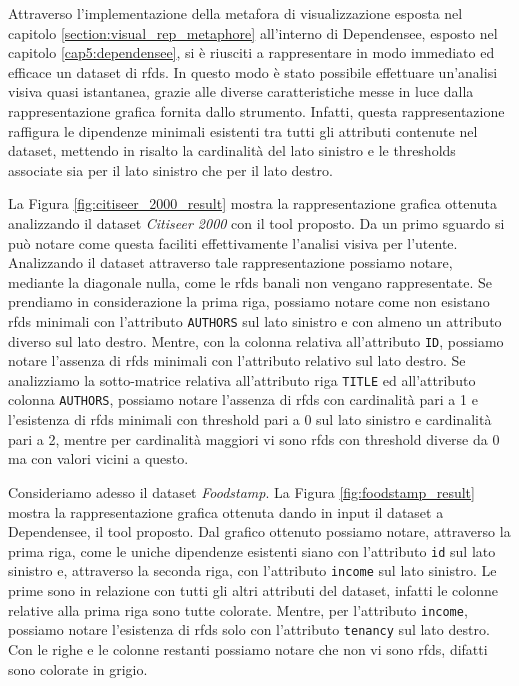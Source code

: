 Attraverso l'implementazione della metafora di visualizzazione esposta nel capitolo \ref{section:visual_rep_metaphore} all'interno di Dependensee, esposto nel capitolo \ref{cap5:dependensee}, si \`{e} riusciti a rappresentare in modo immediato ed efficace un dataset di \acrlong{rfds}. In questo modo \`{e} stato possibile effettuare un'analisi visiva quasi istantanea, grazie alle diverse caratteristiche messe in luce dalla rappresentazione grafica fornita dallo strumento. Infatti, questa rappresentazione raffigura le dipendenze minimali esistenti tra tutti gli attributi contenute nel dataset, mettendo in risalto la cardinalit\`{a} del lato sinistro e le thresholds associate sia per il lato sinistro che per il lato destro.\par
La Figura \ref{fig:citiseer_2000_result} mostra la rappresentazione grafica ottenuta analizzando il dataset \textit{Citiseer 2000} con il tool proposto. Da un primo sguardo si pu\`{o} notare come questa faciliti effettivamente l'analisi visiva per l'utente. Analizzando il dataset attraverso tale rappresentazione possiamo notare, mediante la diagonale nulla, come le \acrlong{rfds} banali non vengano rappresentate. Se prendiamo in considerazione la prima riga, possiamo notare come non esistano \acrlong{rfds} minimali con l'attributo \texttt{AUTHORS} sul lato sinistro e con almeno un attributo diverso sul lato destro. Mentre, con la colonna relativa all'attributo \texttt{ID}, possiamo notare l'assenza di \acrlong{rfds} minimali con l'attributo relativo sul lato destro. Se analizziamo la sotto-matrice relativa all'attributo riga \texttt{TITLE} ed all'attributo colonna \texttt{AUTHORS}, possiamo notare l'assenza di \acrlong{rfds} con cardinalit\`{a} pari a 1 e l'esistenza di \acrlong{rfds} minimali con threshold pari a 0 sul lato sinistro e cardinalit\`{a} pari a 2, mentre per cardinalit\`{a} maggiori vi sono \acrlong{rfds} con threshold diverse da 0 ma con valori vicini a questo.\par
Consideriamo adesso il dataset \textit{Foodstamp}. La Figura \ref{fig:foodstamp_result} mostra la rappresentazione grafica ottenuta dando in input il dataset a Dependensee, il tool proposto. Dal grafico ottenuto possiamo notare, attraverso la prima riga, come le uniche dipendenze esistenti siano con l'attributo \texttt{id} sul lato sinistro e, attraverso la seconda riga, con l'attributo \texttt{income} sul lato sinistro. Le prime sono in relazione con tutti gli altri attributi del dataset, infatti le colonne relative alla prima riga sono tutte colorate. Mentre, per l'attributo \texttt{income}, possiamo notare l'esistenza di \acrlong{rfds} solo con l'attributo \texttt{tenancy} sul lato destro. Con le righe e le colonne restanti possiamo notare che non vi sono \acrlong{rfds}, difatti sono colorate in grigio.

